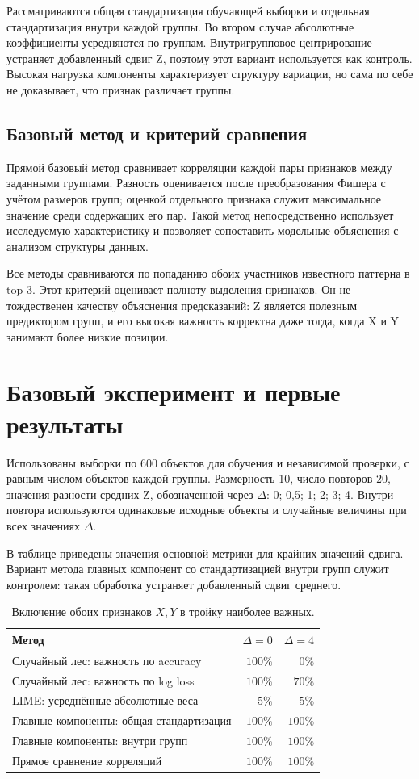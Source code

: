 \documentclass{article}
\begin{document}
Рассматриваются общая стандартизация обучающей выборки и отдельная стандартизация внутри каждой группы. Во втором случае абсолютные коэффициенты усредняются по группам. Внутригрупповое центрирование устраняет добавленный сдвиг Z, поэтому этот вариант используется как контроль. Высокая нагрузка компоненты характеризует структуру вариации, но сама по себе не доказывает, что признак различает группы.

\subsection{Базовый метод и критерий сравнения}

Прямой базовый метод сравнивает корреляции каждой пары признаков между заданными группами. Разность оценивается после преобразования Фишера с учётом размеров групп; оценкой отдельного признака служит максимальное значение среди содержащих его пар. Такой метод непосредственно использует исследуемую характеристику и позволяет сопоставить модельные объяснения с анализом структуры данных.

Все методы сравниваются по попаданию обоих участников известного паттерна в top-3. Этот критерий оценивает полноту выделения признаков. Он не тождественен качеству объяснения предсказаний: Z является полезным предиктором групп, и его высокая важность корректна даже тогда, когда X и Y занимают более низкие позиции.

\section{Базовый эксперимент и первые результаты}

Использованы выборки по 600 объектов для обучения и независимой проверки, с равным числом объектов каждой группы. Размерность 10, число повторов 20, значения разности средних Z, обозначенной через $\Delta$: 0; 0,5; 1; 2; 3; 4. Внутри повтора используются одинаковые исходные объекты и случайные величины при всех значениях $\Delta$.

В таблице приведены значения основной метрики для крайних значений сдвига. Вариант метода главных компонент со стандартизацией внутри групп служит контролем: такая обработка устраняет добавленный сдвиг среднего.

\begin{table}[ht]
\centering
\small
\begin{tabular}{lrr}
\hline
Метод & $\Delta=0$ & $\Delta=4$ \\
\hline
Случайный лес: важность по accuracy & $100\%$ & $0\%$ \\
Случайный лес: важность по log loss & $100\%$ & $70\%$ \\
LIME: усреднённые абсолютные веса & $5\%$ & $5\%$ \\
Главные компоненты: общая стандартизация & $100\%$ & $100\%$ \\
Главные компоненты: внутри групп & $100\%$ & $100\%$ \\
Прямое сравнение корреляций & $100\%$ & $100\%$ \\
\hline
\end{tabular}
\caption{Включение обоих признаков $X,Y$ в тройку наиболее важных.}
\end{table}
\end{document}
